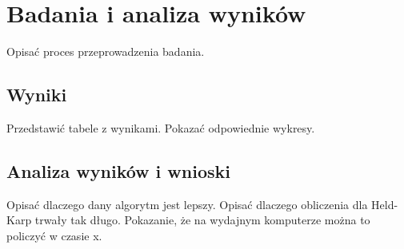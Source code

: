 
\chapter{Badania i analiza wyników}
\label{cha:badaniaIAnalizaWynikow}

Opisać proces przeprowadzenia badania.


\section{Wyniki}
\label{sec:wyniki}

Przedstawić tabele z wynikami. Pokazać odpowiednie wykresy.


\section{Analiza wyników i wnioski}
\label{sec:analizaWynikowIWnioski}

Opisać dlaczego dany algorytm jest lepszy. Opisać dlaczego obliczenia dla Held-Karp trwały tak długo. Pokazanie, że na wydajnym komputerze można to policzyć w czasie x.



